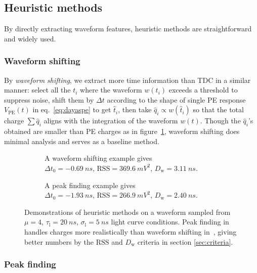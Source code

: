 \subsection{Heuristic methods}
By directly extracting waveform features, heuristic methods are straightforward and widely used. 

\subsubsection{Waveform shifting}
\label{sec:shifting}
By \textit{waveform shifting}, we extract more time information than TDC in a similar manner: select all the $t_i$ where the waveform $w(t_i)$ exceeds a threshold to suppress noise, shift them by $\Delta t$ according to the shape of single PE response $V_\mathrm{PE}(t)$ in eq.~\eqref{eq:dayaspe} to get $\hat{t}_i$, then take $\hat{q}_i \propto w(\hat{t}_i)$ so that the total charge $\sum \hat{q}_i$ aligns with the integration of the waveform $w(t)$.  Though the $\hat{q}_i$'s obtained are smaller than PE charges as in figure~\ref{fig:shifting}, waveform shifting does minimal analysis and serves as a baseline method.

\begin{figure}[H]
  \begin{subfigure}{.5\textwidth}
    \centering
    \resizebox{\textwidth}{!}{}
    \caption{\label{fig:shifting} A waveform shifting example gives \\ $\Delta t_0=\SI{-0.69}{ns}$, $\mathrm{RSS}=\SI{369.6}{mV^2}$, $D_\mathrm{w}=\SI{3.11}{ns}$.}
  \end{subfigure}
  \begin{subfigure}{.5\textwidth}
    \centering
    \resizebox{\textwidth}{!}{}
    \caption{\label{fig:peak} A peak finding example gives \\ $\Delta t_0=\SI{-1.93}{ns}$, $\mathrm{RSS}=\SI{266.9}{mV^2}$, $D_\mathrm{w}=\SI{2.40}{ns}$.}
  \end{subfigure}
  \caption{\label{fig:method}Demonstrations of heuristic methods on a waveform sampled from $\mu=4$, $\tau_\mathrm{l}=\SI{20}{ns}$, $\sigma_\mathrm{l}=\SI{5}{ns}$ light curve conditions.  Peak finding in~ handles charges more realistically than waveform shifting in~, giving better numbers by the $\mathrm{RSS}$ and $D_\mathrm{w}$ criteria in section \ref{sec:criteria}.}
\end{figure}

\subsubsection{Peak finding}
\label{sec:findpeak}

